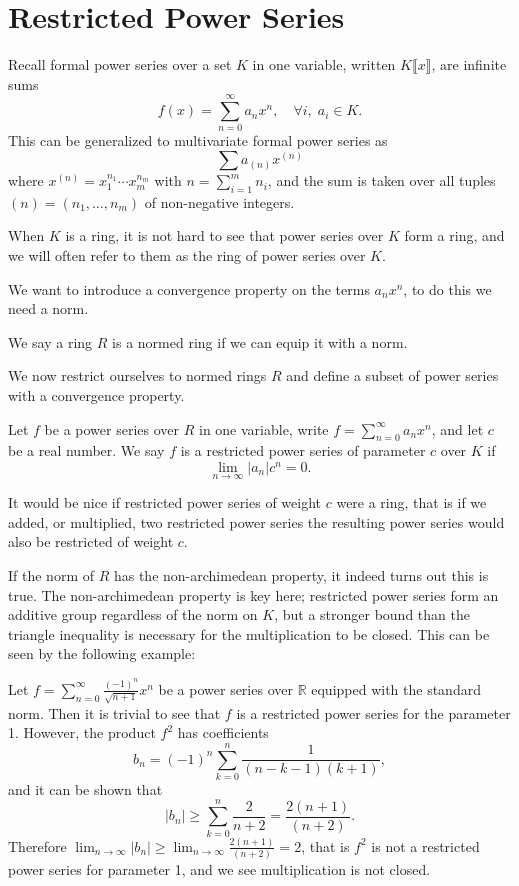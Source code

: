 \section{Restricted Power Series}

Recall formal power series over a set $K$ in one variable, written $K \llbracket x \rrbracket $, are
infinite sums
\[
f(x) = \sum_{n=0}^\infty a_n x^n, \quad \forall i, \; a_i \in K.
\]
This can be generalized to multivariate formal power series as
\[
\sum a_{(n)} x^{(n)}
\]
where $x^{(n)} = x_1^{n_1} \cdots x_m^{n_m}$ with $n = \sum_{i = 1}^m n_i$, and the sum is taken
over all tuples $(n) = (n_1,\dots,n_m)$ of non-negative integers.

When $K$ is a ring, it is not hard to see that power series over $K$ form a ring, and we will often
refer to them as the ring of power series over $K$.

We want to introduce a convergence property on the terms $a_n x^n$, to do this we need a norm.

\begin{defn}
    We say a ring $R$ is a normed ring if we can equip it with a norm.
\end{defn}

We now restrict ourselves to normed rings $R$ and define a subset of power series with a convergence
property.

\begin{defn}
    Let $f$ be a power series over $R$ in one variable, write $f = \sum_{n=0}^\infty a_n x^n$, and
    let $c$ be a real number. We say $f$ is a restricted power series of parameter $c$ over $K$ if
    \[
    \lim_{n \to \infty} \lvert a_n \rvert c^n = 0.
    \]
\end{defn}

It would be nice if restricted power series of weight $c$ were a ring, that is if we added, or
multiplied, two restricted power series the resulting power series would also be restricted of
weight $c$.

If the norm of $R$ has the non-archimedean property, it indeed turns out this is true.
The non-archimedean property is key here; restricted power series form an additive group regardless
of the norm on $K$, but a stronger bound than the triangle inequality is necessary for the
multiplication to be closed. This can be seen by the following example:

\begin{example}

Let $f = \sum_{n=0}^\infty \frac{(-1)^n}{\sqrt{n+1}}x^n$ be a power series over $\mathbb{R}$
equipped with the standard norm. Then it is trivial to see that $f$ is a restricted power series for
the parameter 1. However, the product $f^2$ has coefficients
\[
b_n = (-1)^n \sum_{k=0}^n \frac{1}{(n - k -1)(k+1)},
\]
and it can be shown that
\[
\lvert b_n\rvert \geq \sum_{k = 0}^n \frac{2}{n + 2} = \frac{2 (n + 1)}{(n + 2)}.
\]
Therefore $\lim_{n \to \infty} \lvert b_n \rvert \geq \lim_{n \to \infty} \frac{2(n+1)}{(n+2)}=2$,
that is $f^2$ is not a restricted power series for parameter 1, and we see multiplication is not
closed.

\end{example}

